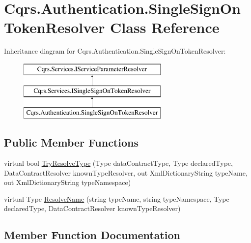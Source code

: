 \hypertarget{classCqrs_1_1Authentication_1_1SingleSignOnTokenResolver}{}\section{Cqrs.\+Authentication.\+Single\+Sign\+On\+Token\+Resolver Class Reference}
\label{classCqrs_1_1Authentication_1_1SingleSignOnTokenResolver}
Inheritance diagram for Cqrs.\+Authentication.\+Single\+Sign\+On\+Token\+Resolver\+:\begin{figure}[H]
\begin{center}
\leavevmode
\includegraphics[height=3.000000cm]{classCqrs_1_1Authentication_1_1SingleSignOnTokenResolver}
\end{center}
\end{figure}
\subsection*{Public Member Functions}
\begin{DoxyCompactItemize}
\item 
virtual bool \hyperlink{classCqrs_1_1Authentication_1_1SingleSignOnTokenResolver_af474315b8fc66d17d64460fab8c63dd1}{Try\+Resolve\+Type} (Type data\+Contract\+Type, Type declared\+Type, Data\+Contract\+Resolver known\+Type\+Resolver, out Xml\+Dictionary\+String type\+Name, out Xml\+Dictionary\+String type\+Namespace)
\item 
virtual Type \hyperlink{classCqrs_1_1Authentication_1_1SingleSignOnTokenResolver_abd546dcdabb00db2e8d0288cbe373895}{Resolve\+Name} (string type\+Name, string type\+Namespace, Type declared\+Type, Data\+Contract\+Resolver known\+Type\+Resolver)
\end{DoxyCompactItemize}


\subsection{Member Function Documentation}
\mbox{\label{classCqrs_1_1Authentication_1_1SingleSignOnTokenResolver_abd546dcdabb00db2e8d0288cbe373895}} 
